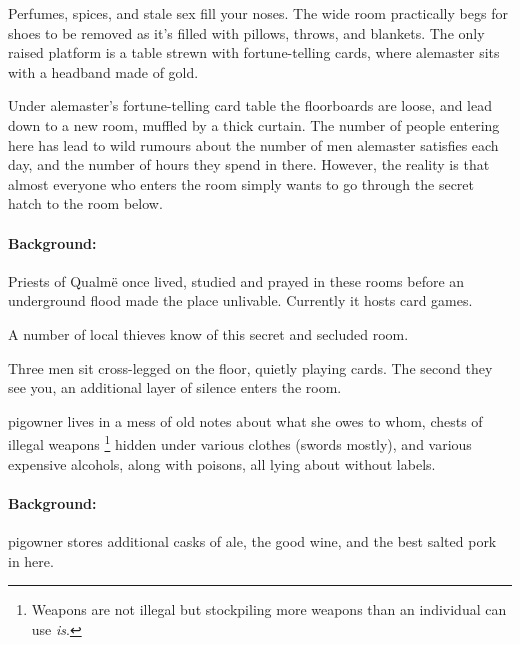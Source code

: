 \begin{multicols}{2}
\begin{boxtext}

  Perfumes, spices, and stale sex fill your noses.
  The wide room practically begs for shoes to be removed as it's filled with pillows, throws, and blankets.
  The only raised platform is a table strewn with fortune-telling cards, where \gls{alemaster} sits with a headband made of gold.

\end{boxtext}

Under \gls{alemaster}'s fortune-telling card table the floorboards are loose, and lead down to a new room, muffled by a thick curtain.
The number of people entering here has lead to wild rumours about the number of men \gls{alemaster} satisfies each day, and the number of hours they spend in there.
However, the reality is that almost everyone who enters the room simply wants to go through the secret hatch to the room below.

\alemaster


\paragraph{Background:}
Priests of Qualm\"{e} once lived, studied and prayed in these rooms before an underground flood made the place unlivable.
Currently it hosts card games.

A number of local thieves know of this secret and secluded room.

\begin{boxtext}
  Three men sit cross-legged on the floor, quietly playing cards.
  The second they see you, an additional layer of silence enters the room.
\end{boxtext}



\Gls{pigowner} lives in a mess of old notes about what she owes to whom, chests of illegal weapons%
\footnote{Weapons are not illegal but stockpiling more weapons than an individual can use \emph{is}.}
hidden under various clothes (swords mostly), and various expensive alcohols, along with poisons, all lying about without labels.

\label{pig_pantry}

\paragraph{Background:}
\Gls{pigowner} stores additional casks of ale, the good wine, and the best salted pork in here.


\end{multicols}
